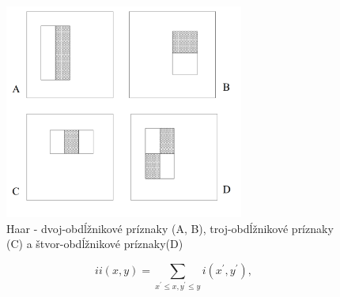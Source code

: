 \documentclass[slovak,master,dept460,male,cpp,cpdeclaration]{diploma}
\begin{document}
  \begin{figure}[ht]
	\centering
	\includegraphics[width=0.7\textwidth]{Figures/haar1.png}
	\caption{Haar - dvoj-obdĺžnikové príznaky (A, B), troj-obdĺžnikové príznaky (C) a štvor-obdĺžnikové príznaky(D)\cite{viola2001robust}}
	\label{fig:Haar1}
\end{figure}

\begin{equation}
ii(x,y)=\sum_{x^{\prime}\leq x,y^{\prime}\leq y}i(x^{\prime},y^{\prime}),
\label{eq:Výpočet integrálneho obrazu}
\end{equation}


\newpage
\end{document}
